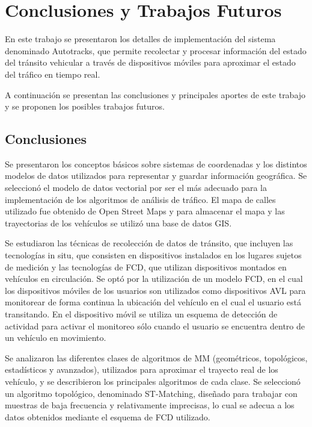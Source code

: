 \chapter{Conclusiones y Trabajos Futuros}
\label{cap:8}

En este trabajo se presentaron los detalles de implementación del sistema  denominado Autotracks, que permite recolectar y procesar información del estado del tránsito vehicular a través de dispositivos móviles para aproximar el estado del tráfico en tiempo real.

A continuación se presentan las conclusiones y principales aportes de este trabajo y se proponen los posibles trabajos futuros.

\section{Conclusiones}

Se presentaron los conceptos básicos sobre sistemas de coordenadas y los distintos modelos de datos utilizados para representar y guardar información geográfica. Se seleccionó el modelo de datos vectorial por ser el más adecuado para la implementación de los algoritmos de análisis de tráfico. El mapa de calles utilizado fue obtenido de Open Street Maps y para almacenar el mapa y las trayectorias de los vehículos se utilizó una base de datos GIS.

Se estudiaron las técnicas de recolección de datos de tránsito, que incluyen las tecnologías in situ, que consisten en dispositivos instalados en los lugares sujetos de medición y las tecnologías de FCD, que utilizan dispositivos montados en vehículos en circulación. Se optó por la utilización de un modelo FCD, en el cual los dispositivos móviles de los usuarios son utilizados como dispositivos AVL para monitorear de forma continua la ubicación del vehículo en el cual el usuario está transitando. En el dispositivo móvil se utiliza un esquema de detección de actividad para activar el monitoreo sólo cuando el usuario se encuentra dentro de un vehículo en movimiento.

Se analizaron las diferentes clases de algoritmos de MM (geométricos, topológicos, estadísticos y avanzados), utilizados para aproximar el trayecto real de los vehículo, y se describieron los principales algoritmos de cada clase. Se seleccionó un algoritmo topológico, denominado ST-Matching, diseñado para trabajar con muestras de baja frecuencia y relativamente imprecisas, lo cual se adecua a los datos obtenidos mediante el esquema de FCD utilizado.

